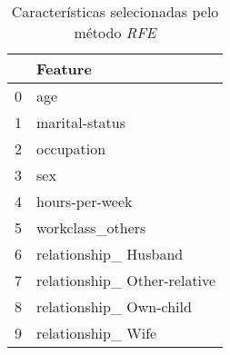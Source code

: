 \begin{table}
\centering
\caption{Características selecionadas pelo método \textit{RFE}}
\begin{tabular}{ll}
\toprule
{} &                       Feature \\
\midrule
0 &                           age \\
1 &                marital-status \\
2 &                    occupation \\
3 &                           sex \\
4 &                hours-per-week \\
5 &              workclass\_others \\
6 &         relationship\_ Husband \\
7 &  relationship\_ Other-relative \\
8 &       relationship\_ Own-child \\
9 &            relationship\_ Wife \\
\bottomrule
\end{tabular}
\end{table}
